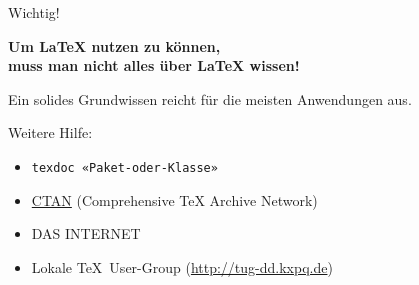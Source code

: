 

\begin{frame}[fragile]

  \onslide<+->

  \begin{block}{Wichtig!}
    \begin{center}
      \Large
      
      \textbf{Um \LaTeX{} nutzen zu können,\\ muss man nicht alles über \LaTeX{}
        wissen!}
    \end{center}

    Ein solides Grundwissen reicht für die meisten Anwendungen aus.
  \end{block}

  \onslide<+->

  \bigskip
  
  Weitere Hilfe:

  \begin{itemize}
  \item \verb|texdoc «Paket-oder-Klasse»|
  \item \href{http://ctan.org}{CTAN} (Comprehensive \TeX{} Archive Network)
  \item DAS INTERNET
  \item Lokale \TeX\ User-Group (\url{http://tug-dd.kxpq.de})
  \end{itemize}
  
\end{frame}

